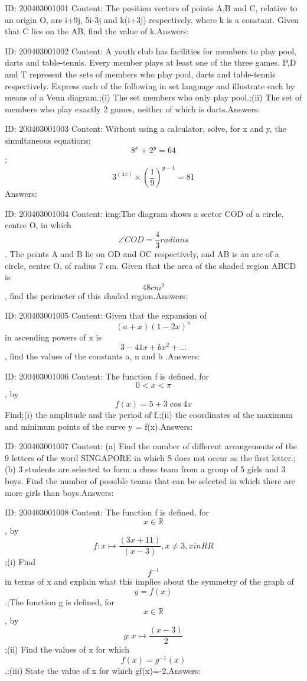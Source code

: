\documentclass{article}
\begin{document}
ID: 200403001001
Content:
The position vectors of points A,B and C, relative to an origin O, are i+9j, 5i-3j and k(i+3j) respectively, where k is a constant. Given that C lies on the AB, find the value of k.Answers:

ID: 200403001002
Content:
A youth club has facilities for members to play pool, darts and table-tennis. Every member plays at least one of the three games. P,D and T represent the sets of members who play pool, darts and table-tennis respectively. Express each of the following in set language and illustrate each by means of a Venn diagram.;(i)	The set members who only play pool.;(ii)	The set of members who play exactly 2 games, neither of which is darts.Answers:

ID: 200403001003
Content:
Without using a calculator, solve, for x and y, the simultaneous equations;$$8^x + 2^y=64$$;$$3^{(4x)} \times (\frac{1}{9})^{y-1} = 81$$Answers:

ID: 200403001004
Content:
img;The diagram shows a sector COD of a circle, centre O, in which $$\angle COD= \frac{4}{3} radians$$. The points A and B lie on OD and OC respectively, and AB is an arc of a circle, centre O, of radius 7 cm. Given that the area of the shaded region ABCD is $$48cm^2$$, find the perimeter of this shaded region.Answers:

ID: 200403001005
Content:
Given that the expansion of $$(a+x)(1-2x)^n$$ in ascending powers of x is $$3-41x+bx^2+...$$, find the values of the constants a, n and b .Answers:

ID: 200403001006
Content:
The function f is defined, for $$0< x<\pi$$, by $$f(x) = 5 + 3 \cos  4x$$ Find;(i)	the amplitude and the period of f,;(ii)	the coordinates of the maximum and minimum points of the curve y = f(x).Answers:

ID: 200403001007
Content:
(a)	Find the number of different arrangements of the 9 letters of the word SINGAPORE in which S does not occur as the first letter.;(b)	3 students are selected to form a chess team from a group of 5 girls and 3 boys. Find the number of possible teams that can be selected in which there are more girls than boys.Answers:

ID: 200403001008
Content:
The function f is defined, for $$ x\in \mathbb {R}$$, by $$f:x \mapsto \frac{(3x+11)}{(x-3)}, x \neq 3, x in RR$$ ;(i) Find $$f^{-1}$$ in terms of x and explain what this implies about the symmetry of the graph of $$y= f(x)$$.;The function g is defined, for $$ x\in \mathbb {R}$$, by $$g: x \mapsto \frac{(x-3)}{2}$$;(ii) Find the values of x for which $$f(x)=g^{-1}(x)$$.;(iii) State the value of x for which gf(x)=-2.Answers:
\end{document}
